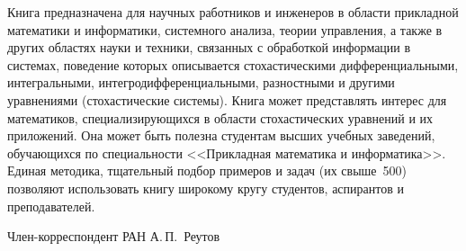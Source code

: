      Книга предназначена для научных работников и инженеров в области 
прикладной математики и информатики, системного анализа, теории управления, а 
также в  других областях науки и техники, связанных с обработкой информации в 
системах, поведение которых описывается стохастическими дифференциальными, 
интегральными, интегродифференциальными, разностными и другими уравнениями 
(стохастические системы). Книга может представлять интерес для математиков, 
специализирующихся в области стохастических уравнений и их приложений. Она 
может быть полезна студентам высших учебных заведений, обучающихся по 
специальности <<Прикладная математика и информатика>>. Единая методика, 
тщательный подбор примеров и задач (их свыше~500) позволяют использовать книгу 
широкому кругу студентов, аспирантов и преподавателей.
     \vspace*{12pt}
     
     \hfill Член-корреспондент РАН А.\,П.~Реутов